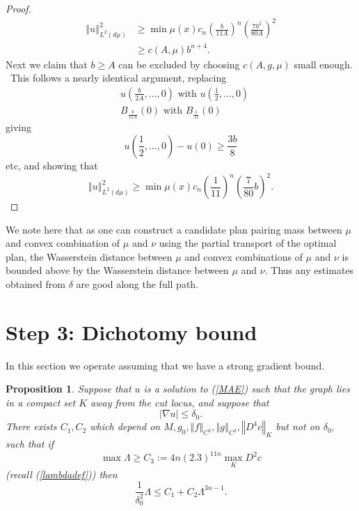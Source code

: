 \documentclass[11pt,letterpaper]{amsart}%
\newtheorem{proposition}[theorem]{Proposition}
\numberwithin{equation}{section}
\begin{document}
\begin{proof}
\begin{align*}
\left\Vert u\right\Vert _{L^{2}(d\mu)}^{2}  &  \geq\min\mu(x)c_{n}\left(
\frac{b}{11A}\right)  ^{n}\left(  \frac{7b^{2}}{80A}\right)  ^{2}\\
&  \geq c(A,\mu)b^{n+4}.
\end{align*}
Next we claim that $b\geq A$ can be excluded by choosing $c(A,g,\mu)$ small
enough. \ This follows a nearly identical argument, replacing
\begin{align*}
&  u(\frac{b}{2A},...,0)\text{ with }u(\frac{1}{2},...,0)\\
&  B_{\frac{b}{11A}}(0)\text{ with }B_{\frac{1}{11}}(0)
\end{align*}
giving%
\[
u(\frac{1}{2},...,0)-u(0)\geq\frac{3b}{8}%
\]
etc, and showing that
\[
\left\Vert u\right\Vert _{L^{2}(d\mu)}^{2}\geq\min\mu(x)c_{n}\left(  \frac
{1}{11}\right)  ^{n}\left(  \frac{7}{80}b\right)  ^{2}.
\]

\end{proof}

We note here that as one can construct a candidate plan pairing mass between $\mu$ and convex combination of $\mu$ and $\nu$ using the partial transport of the optimal plan, the Wasserstein distance between $\mu$ and convex combinations of  $\mu$ and $\nu$ is bounded above by the Wasserstein distance between $\mu$ and $\nu.$  Thus any estimates obtained from $\delta$ are good along the full path.  

\section{Step 3: Dichotomy bound}

In this section we operate assuming that we have a strong gradient bound. 

\begin{proposition}
\label{chaz}Suppose that $u$ is a solution to (\ref{MAE}) such that the graph
lies in a compact set $K$ away from the cut locus, and suppose that
\[
\left\vert \nabla u\right\vert \leq\delta_{0}.
\]
There exists $C_{1},C_{2}$ which depend on $M,g_{0},\left\Vert f\right\Vert
_{C^{2}},\left\Vert g\right\Vert _{C^{2}},\left\Vert D^{4}c\right\Vert _{K}$
but not on $\delta_{0},$ such that if
\[
\max\Lambda\geq C_{3}:=4n\left(  2.3\right)  ^{11n}\max_{K}D^{2}c
\]
(recall (\ref{lambdadef}))  then
\begin{equation}
\frac{1}{\delta_{0}^{2}}\Lambda\leq C_{1}+C_{2} \Lambda
^{3n-1}. \label{step3}%
\end{equation}

\end{proposition}
\end{document}
